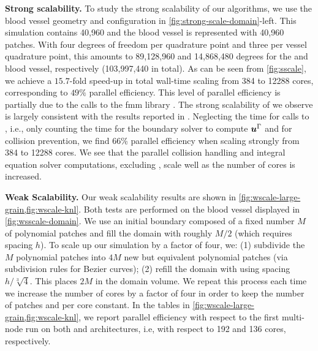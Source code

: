 \textbf{Strong scalability. }\label{ss:strong}
To study the strong scalability of our algorithms, we use the blood vessel
geometry and \rbc configuration in
\cref{fig:strong-scale-domain}-left.
This simulation contains 40,960 \rbcs and the blood vessel is
represented with 40,960 patches.
With four degrees of freedom per \rbc quadrature point and three per vessel
quadrature point, this amounts to
89,128,960 and 14,868,480 degrees for the \rbcs and blood vessel, respectively 
(103,997,440 in total).
As can be seen from \cref{fig:sscale}, we achieve a $15.7$-fold
speed-up in total wall-time scaling from 384 to 12288 cores,
corresponding to $49\%$ parallel efficiency.  This level of  parallel
efficiency is partially due to the calls to the fmm library
\pvfmm. The strong scalability of \pvfmm we observe is largely
consistent with the results reported in \cite{malhotra2016algorithm}.
Neglecting the time for calls to \fmm, i.e., only counting the time
for the boundary solver to compute ${\bm{u}}^\Gamma$ and for collision
prevention, we find $66$\%
parallel efficiency when scaling strongly from 384 to 12288 cores.
We see that the parallel collision handling and integral equation solver
computations, excluding \fmm, scale well as the number of cores is increased.

\textbf{Weak Scalability. }\label{ss:weak}
Our weak scalability results are shown in
\cref{fig:wscale-large-grain,fig:wscale-knl}.
Both tests are performed on the blood vessel displayed in
\cref{fig:wsscale-domain}.
We use an initial boundary composed of a fixed number $M$ of polynomial
patches and fill the domain with roughly $M/2$ \rbcs (which requires spacing
$h$).
To scale up our simulation by a factor of four, we: (1) subdivide the $M$ polynomial
patches into $4M$ new but equivalent polynomial patches (via subdivision rules
for Bezier curves); (2) refill the domain with \rbcs using spacing 
$h/\sqrt[3]{4}$. This places $2M$ \rbcs in the domain volume.
We repeat this process each time we increase the number of cores by a factor of
four in order to keep the number of patches and \rbcs per core constant.
In the tables in  \cref{fig:wscale-large-grain,fig:wscale-knl},
we report parallel efficiency with respect to the
first multi-node run on both \skx and \knl architectures, i.e, with
respect to 192 and 136 cores, respectively.

